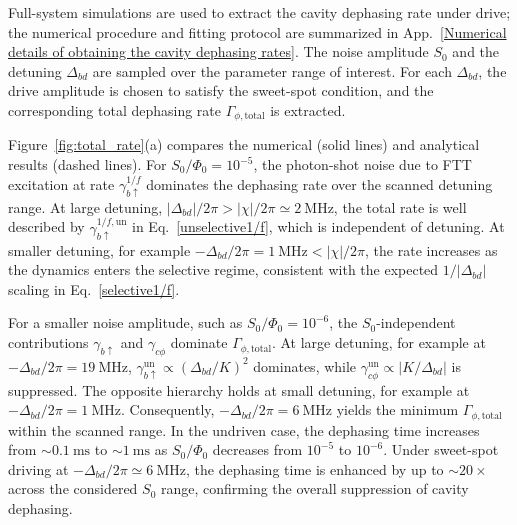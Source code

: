 Full-system simulations are used to extract the cavity dephasing rate under drive; the
numerical procedure and fitting protocol are summarized in
App.~\ref{Numerical details of obtaining the cavity dephasing rates}. The noise amplitude $S_0$ and the
detuning $\Delta_{bd}$ are sampled over the parameter range of interest. For each
$\Delta_{bd}$, the drive amplitude is chosen to satisfy the sweet-spot condition, and
the corresponding total dephasing rate $\Gamma_{\phi,\mathrm{total}}$ is extracted.

Figure~\ref{fig:total_rate}(a) compares the numerical (solid lines) and analytical results (dashed lines). For $S_0/\Phi_0=10^{-5}$, the
photon-shot noise due to FTT excitation at rate $\gamma_{b\uparrow}^{1/f}$ dominates the dephasing rate over the scanned detuning range. At large detuning,
$\lvert\Delta_{bd}\rvert/2\pi>\lvert\chi\rvert/2\pi\simeq 2~\mathrm{MHz}$, the total
rate is well described by $\gamma_{b\uparrow}^{1/f,\mathrm{un}}$ in Eq.~\eqref{unselective1/f}, which is independent
of detuning. At smaller detuning, for example
$-\Delta_{bd}/2\pi=1~\mathrm{MHz}<\lvert\chi\rvert/2\pi$, the rate increases as the
dynamics enters the selective regime, consistent with the expected
$1/\lvert\Delta_{bd}\rvert$ scaling in Eq.~\eqref{selective1/f}.

For a smaller noise amplitude, such as $S_0/\Phi_0=10^{-6}$, the $S_0$-independent contributions $\gamma_{b\uparrow}$ and
$\gamma_{c\phi}$ dominate $\Gamma_{\phi,\mathrm{total}}$. At large
detuning, for example at $-\Delta_{bd}/2\pi=19~\mathrm{MHz}$,
$\gamma_{b\uparrow}^{\mathrm{un}}\propto(\Delta_{bd}/K)^2$ dominates, while
$\gamma_{c\phi}^{\mathrm{un}}\propto \lvert K/\Delta_{bd}\rvert$ is suppressed. The
opposite hierarchy holds at small detuning, for example at
$-\Delta_{bd}/2\pi=1~\mathrm{MHz}$. Consequently,
$-\Delta_{bd}/2\pi=6~\mathrm{MHz}$ yields the minimum
$\Gamma_{\phi,\mathrm{total}}$ within the scanned range. In the undriven case, the
dephasing time increases from $\sim 0.1~\mathrm{ms}$ to $\sim 1~\mathrm{ms}$ as
$S_0/\Phi_0$ decreases from $10^{-5}$ to $10^{-6}$. Under sweet-spot driving at
$-\Delta_{bd}/2\pi\simeq 6~\mathrm{MHz}$, the dephasing time is enhanced by up to
$\sim 20\times$ across the considered $S_0$ range, confirming the overall suppression
of cavity dephasing.

